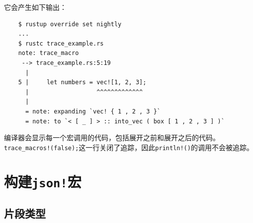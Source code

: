它会产生如下输出：
\begin{verbatim}
    $ rustup override set nightly
    ...
    $ rustc trace_example.rs
    note: trace_macro
     --> trace_example.rs:5:19
      |
    5 |     let numbers = vec![1, 2, 3];
      |                   ^^^^^^^^^^^^^
      |
      = note: expanding `vec! { 1 , 2 , 3 }`
      = note: to `< [ _ ] > :: into_vec ( box [ 1 , 2 , 3 ] )`
\end{verbatim}
编译器会显示每一个宏调用的代码，包括展开之前和展开之后的代码。\texttt{trace\_macros!(false);}这一行关闭了追踪，因此\texttt{println!()}的调用不会被追踪。

\section{构建\texttt{json!}宏}



\subsection{片段类型}\label{FragType}
